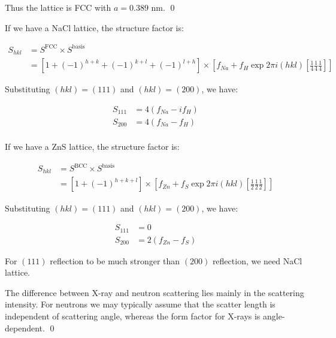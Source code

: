 \documentclass[12pt]{article}
\begin{document}
Thus the lattice is FCC with $a = 0.389$ nm.
\qed




If we have a NaCl lattice, the structure factor is:

\begin{equation}
    \begin{split}
        S_{hkl} &= S^{\text{FCC}} \times S^{\text{basis}} \\
        &= \left[ 1 + (-1)^{h+k} + (-1)^{k+l} + (-1)^{l+h} \right] \times \left[ f_{Na} + f_{H} \exp{2\pi i (hkl) [\frac{1}{4} \frac{1}{4} \frac{1}{4}]} \right]
    \end{split}
\end{equation}

Substituting $(hkl) = (111)$ and $(hkl) = (200)$, we have:

\begin{equation}
    \begin{split}
        S_{111} &= 4(f_{Na} - if_{H}) \\
        S_{200} &= 4(f_{Na} - f_{H}) \\
    \end{split}
\end{equation}

If we have a ZnS lattice, the structure factor is:

\begin{equation}
    \begin{split}
        S_{hkl} &= S^{\text{BCC}} \times S^{\text{basis}} \\
        &= \left[ 1 + (-1)^{h+k+l} \right] \times \left[ f_{Zn} + f_{S} \exp{2\pi i (hkl) [\frac{1}{2} \frac{1}{2} \frac{1}{2}]} \right]
    \end{split}
\end{equation}

Substituting $(hkl) = (111)$ and $(hkl) = (200)$, we have:

\begin{equation}
    \begin{split}
        S_{111} &= 0 \\
        S_{200} &= 2(f_{Zn} - f_{S})
    \end{split}
\end{equation}

For $(111)$ reflection to be much stronger than $(200)$ reflection, we need NaCl lattice.

The difference between X-ray and neutron scattering lies mainly in the scattering intensity. For neutrons we may typically assume that the scatter length is independent of scattering angle, whereas the form factor for X-rays is angle-dependent.
\qed
\end{document}
